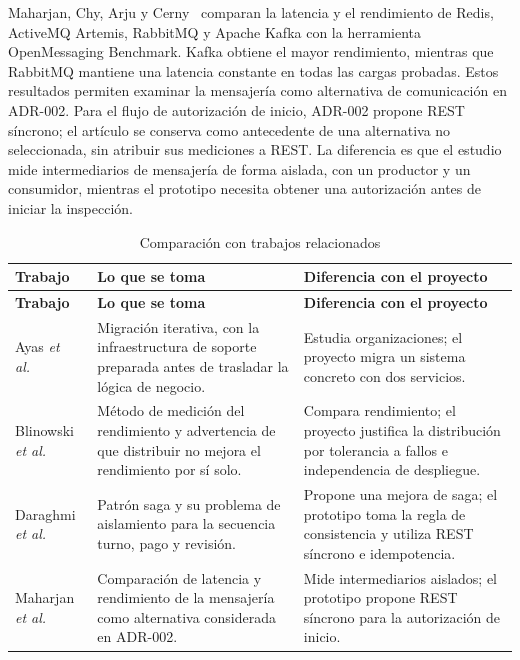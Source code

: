 \documentclass[11pt,a4paper]{article}
\begin{document}
Maharjan, Chy, Arju y Cerny~\cite{maharjan2023benchmarking} comparan la latencia y el rendimiento de Redis, ActiveMQ Artemis, RabbitMQ y Apache Kafka con la herramienta OpenMessaging Benchmark. Kafka obtiene el mayor rendimiento, mientras que RabbitMQ mantiene una latencia constante en todas las cargas probadas. Estos resultados permiten examinar la mensajería como alternativa de comunicación en ADR-002. Para el flujo de autorización de inicio, ADR-002 propone REST síncrono; el artículo se conserva como antecedente de una alternativa no seleccionada, sin atribuir sus mediciones a REST. La diferencia es que el estudio mide intermediarios de mensajería de forma aislada, con un productor y un consumidor, mientras el prototipo necesita obtener una autorización antes de iniciar la inspección.

\begin{xltabular}{\textwidth}{L{3cm}XX}
  \caption{Comparación con trabajos relacionados}\label{tab:relacionados}\\
  \toprule
  \textbf{Trabajo} & \textbf{Lo que se toma} & \textbf{Diferencia con el proyecto} \\
  \midrule
  \endfirsthead
  \toprule
  \textbf{Trabajo} & \textbf{Lo que se toma} & \textbf{Diferencia con el proyecto} \\
  \midrule
  \endhead
  \bottomrule
  \endfoot
  Ayas \emph{et al.}~\cite{ayas2023migration} & Migración iterativa, con la infraestructura de soporte preparada antes de trasladar la lógica de negocio. & Estudia organizaciones; el proyecto migra un sistema concreto con dos servicios. \\
    Blinowski \emph{et al.}~\cite{blinowski2022monolithic} & Método de medición del rendimiento y advertencia de que distribuir no mejora el rendimiento por sí solo. & Compara rendimiento; el proyecto justifica la distribución por tolerancia a fallos e independencia de despliegue. \\
    Daraghmi \emph{et al.}~\cite{daraghmi2022saga} & Patrón saga y su problema de aislamiento para la secuencia turno, pago y revisión. & Propone una mejora de saga; el prototipo toma la regla de consistencia y utiliza REST síncrono e idempotencia. \\
    Maharjan \emph{et al.}~\cite{maharjan2023benchmarking} & Comparación de latencia y rendimiento de la mensajería como alternativa considerada en ADR-002. & Mide intermediarios aislados; el prototipo propone REST síncrono para la autorización de inicio. \\
\end{xltabular}
\end{document}
